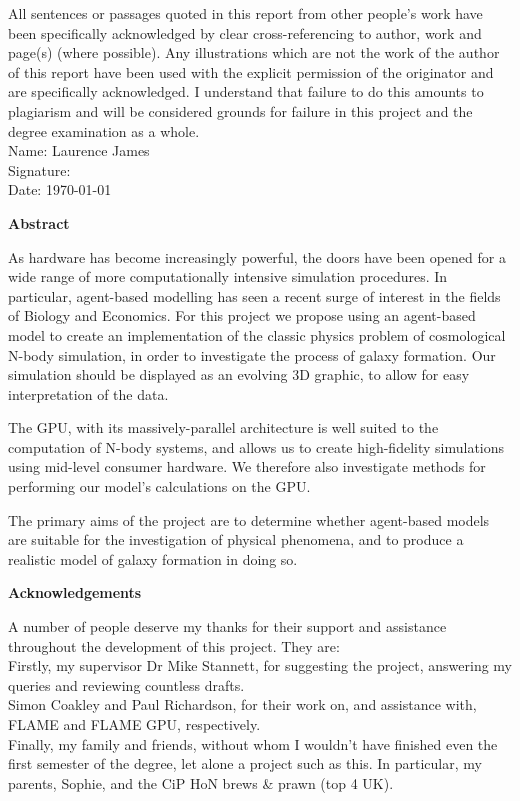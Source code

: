 \documentclass[11pt,a4paper]{article}
\begin{document}

\setcounter{tocdepth}{3} 



\newpage 
\noindent All sentences or passages quoted in this report from other people's work have been specifically acknowledged by clear cross-referencing to author, work and page(s) (where possible). Any illustrations which are not the work of the author of this report have been used with the explicit permission of the originator and are specifically acknowledged. I understand that failure to do this amounts to plagiarism and will be considered grounds for failure in this project and the degree examination as a whole. 
\\[0.3cm]
\large{Name: Laurence James}
\\[0.3cm]
\large{Signature:}
\\[0.3cm]
\large{Date: \today}

\newpage
\begin{center}
\bf{Abstract}
\end{center}
As hardware has become increasingly powerful, the doors have been opened for a wide range of more computationally intensive simulation procedures. In particular, agent-based modelling has seen a recent surge of interest in the fields of Biology and Economics. For this project we propose using an agent-based model to create an implementation of the classic physics problem of cosmological N-body simulation, in order to investigate the process of galaxy formation. Our simulation should be displayed as an evolving 3D graphic, to allow for easy interpretation of the data.

The GPU, with its massively-parallel architecture is well suited to the computation of N-body systems, and allows us to create high-fidelity simulations using mid-level consumer hardware. We therefore also investigate methods for performing our model's calculations on the GPU.

The primary aims of the project are to determine whether agent-based models are suitable for the investigation of physical phenomena, and to produce a realistic model of galaxy formation in doing so.
\newpage
\begin{center}
\bf{Acknowledgements}
\end{center}
A number of people deserve my thanks for their support and assistance throughout the development of this project. They are:
\\[0.3cm]
Firstly, my supervisor Dr Mike Stannett, for suggesting the project, answering my queries and reviewing countless drafts.
\\[0.3cm]
Simon Coakley and Paul Richardson, for their work on, and assistance with, FLAME and FLAME GPU, respectively.
\\[0.3cm]
Finally, my family and friends, without whom I wouldn't have finished even the first semester of the degree, let alone a project such as this. In particular, my parents, Sophie, and the CiP HoN brews \& prawn (top 4 UK).
\newpage
\end{document}
